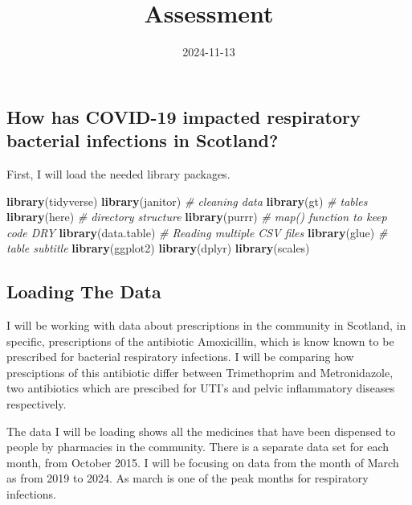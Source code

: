 \documentclass[
]{article}
\title{Assessment}
\author{}
\date{\vspace{-2.5em}2024-11-13}
\newenvironment{Shaded}{\begin{snugshade}}{\end{snugshade}}
\newcommand{\CommentTok}[1]{\textcolor[rgb]{0.56,0.35,0.01}{\textit{#1}}}
\newcommand{\FunctionTok}[1]{\textcolor[rgb]{0.13,0.29,0.53}{\textbf{#1}}}
\newcommand{\NormalTok}[1]{#1}
\begin{document}
\maketitle

\subsection{How has COVID-19 impacted respiratory bacterial infections
in
Scotland?}\label{how-has-covid-19-impacted-respiratory-bacterial-infections-in-scotland}

First, I will load the needed library packages.

\begin{Shaded}
\begin{Highlighting}[]
\FunctionTok{library}\NormalTok{(tidyverse)}
\FunctionTok{library}\NormalTok{(janitor) }\CommentTok{\# cleaning data}
\FunctionTok{library}\NormalTok{(gt) }\CommentTok{\# tables}
\FunctionTok{library}\NormalTok{(here) }\CommentTok{\# directory structure}
\FunctionTok{library}\NormalTok{(purrr) }\CommentTok{\# map() function to keep code DRY}
\FunctionTok{library}\NormalTok{(data.table) }\CommentTok{\# Reading multiple CSV files }
\FunctionTok{library}\NormalTok{(glue) }\CommentTok{\# table subtitle}
\FunctionTok{library}\NormalTok{(ggplot2)}
\FunctionTok{library}\NormalTok{(dplyr)}
\FunctionTok{library}\NormalTok{(scales)}
\end{Highlighting}
\end{Shaded}

\subsection{Loading The Data}\label{loading-the-data}

I will be working with data about prescriptions in the community in
Scotland, in specific, prescriptions of the antibiotic Amoxicillin,
which is know known to be prescribed for bacterial respiratory
infections. I will be comparing how presciptions of this antibiotic
differ between Trimethoprim and Metronidazole, two antibiotics which are
prescibed for UTI's and pelvic inflammatory diseases respectively.

The data I will be loading shows all the medicines that have been
dispensed to people by pharmacies in the community. There is a separate
data set for each month, from October 2015. I will be focusing on data
from the month of March as from 2019 to 2024. As march is one of the
peak months for respiratory infections.
\end{document}
